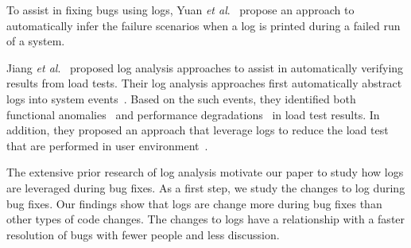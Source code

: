 To assist in fixing bugs using logs, Yuan \emph{et al$.$}~\cite{Yuan:2010:SED:1736020.1736038} propose an approach to automatically infer the failure scenarios when a log is printed during a failed run of a system.


Jiang \textsl{et al$ . $}~\cite{Jiang:2008:AAA:1400155.1400158,JiangICSM2008,JiangICSM20092,Jiang:2010:ICS:1850000.1850068} proposed log analysis approaches to assist in automatically verifying results from load tests. Their log analysis approaches first automatically abstract logs into system events~\cite{Jiang:2008:AAA:1400155.1400158}. Based on the such events, they identified both functional anomalies~\cite{JiangICSM2008} and performance degradations~\cite{JiangICSM20092} in load test results. In addition, they proposed an approach that leverage logs to reduce the load test that are performed in user environment~\cite{Jiang:2010:ICS:1850000.1850068}.

The extensive prior research of log analysis motivate our paper to study how logs are leveraged during bug fixes. As a first step, we study the changes to log during bug fixes. Our findings show that logs are change more during bug fixes than other types of code changes. The changes to logs have a relationship with a faster resolution of bugs with fewer people and less discussion.





